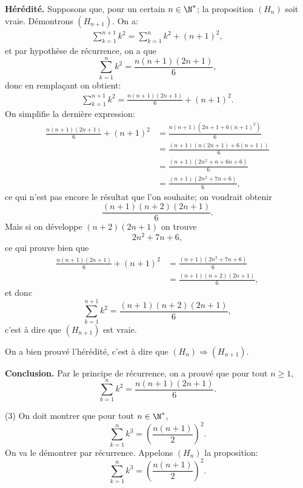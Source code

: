 \documentclass[12pt, a4paper,oneside]{article} %
\begin{document}
\textbf{Hérédité.}
Supposons que, pour un certain $ n \in \N^{*} $;
la proposition $ (H_{n}) $ soit vraie.
Démontrons $ (H_{n+1}) $.
On a:
\begin{align}
	\sum_{k=1}^{n+1}
	k^2
	=
	\sum_{k=1}^{n}
	k^2
	+
	(n+1)^2
	,
\end{align}
et par hypothèse de récurrence,
on a que
\begin{equation}
	\sum_{k=1}^{n} k^2
	=
	\frac{n(n+1)(2n+1)}{6}
	,
\end{equation}
donc en remplaçant on obtient:
\begin{align}
	\sum_{k=1}^{n+1}
	k^2
	=
	\frac{n(n+1)(2n+1)}{6}
	+
	(n+1)^2
	.
\end{align}
On simplifie la dernière expression:
\begin{align}
	\frac{n(n+1)(2n+1)}{6}
	+
	(n+1)^2
	& =
	\frac{n(n+1)(2n+1 + 6(n+1)^2)}{6}
	\\
	& =
	\frac{(n+1)(n(2n+1) + 6(n+1))}{6}
	\\
	& =
	\frac{(n+1)(2n^2+n + 6n+6)}{6}
	\\
	& =
	\frac{(n+1)(2n^2+7n+6)}{6}
	,
\end{align}
ce qui n'est pas encore le résultat
que l'on souhaite; on voudrait
obtenir
\begin{equation}
	\frac{(n+1)(n+2)(2n+1)}{6}
	.
\end{equation}
Mais si on développe
$ (n+2)(2n+1) $
on trouve
\begin{equation}
	2n^2+7n+6
	,
\end{equation}
ce qui prouve bien que 
\begin{align}
	\frac{n(n+1)(2n+1)}{6}
	+
	(n+1)^2
	& =
	\frac{(n+1)(2n^2+7n+6)}{6}
	\\
	& =
	\frac{(n+1)(n+2)(2n+1)}{6}
	,
\end{align}
et donc
\begin{equation}
	\sum_{k=1}^{n+1}
	k^2
	=
	\frac{(n+1)(n+2)(2n+1)}{6}
	,
\end{equation}
c'est à dire que $ (H_{n+1}) $
est vraie.

On a bien prouvé l'hérédité,
c'est à dire que
$ (H_{n}) \Rightarrow (H_{n+1}) $.

\textbf{Conclusion.}
Par le principe de récurrence,
on a prouvé que
pour tout $ n \ge 1 $,
\begin{equation}
	\sum_{k=1}^{n} k^2
	=
	\frac{n(n+1)(2n+1)}{6}
	.
\end{equation}


(3) On doit montrer que pour tout
$ n \in \N^{*} $,
\begin{equation}
	\sum_{k=1}^{n} k^3
	=
	\left( 
	\frac{n(n+1)}{2}
	\right)^2
	.
\end{equation}
On va le démontrer par récurrence.
Appelons $ (H_{n}) $ la proposition:
\begin{equation}
	\sum_{k=1}^{n} k^3
	=
	\left( 
		\frac{n(n+1)}{2}
	\right)^2
	.
\end{equation}
\end{document}
